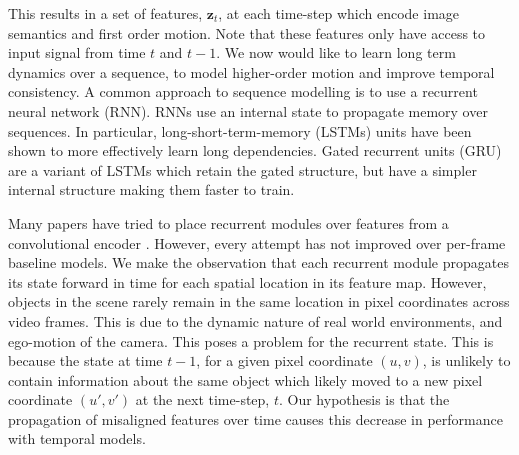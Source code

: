 This results in a set of features, $\mathbf{z}_t$, at each time-step which encode image semantics and first order motion. Note that these features only have access to input signal from time $t$ and $t-1$. We now would like to learn long term dynamics over a sequence, to model higher-order motion and improve temporal consistency. A common approach to sequence modelling is to use a recurrent neural network (RNN). RNNs use an internal state to propagate memory over sequences. In particular, long-short-term-memory (LSTMs) units \cite{hochreiter1997long} have been shown to more effectively learn long dependencies. Gated recurrent units (GRU) \cite{cho2014learning} are a variant of LSTMs which retain the gated structure, but have a simpler internal structure making them faster to train.

Many papers have tried to place recurrent modules over features from a convolutional encoder \cite{patraucean2015spatio,valipour2017recurrent}. However, every attempt has not improved over per-frame baseline models. We make the observation that each recurrent module propagates its state forward in time for each spatial location in its feature map. However, objects in the scene rarely remain in the same location in pixel coordinates across video frames. This is due to the dynamic nature of real world environments, and ego-motion of the camera. This poses a problem for the recurrent state. This is because the state at time $t-1$, for a given pixel coordinate $(u,v)$, is unlikely to contain information about the same object which likely moved to a new pixel coordinate $(u',v')$ at the next time-step, $t$. Our hypothesis is that the propagation of misaligned features over time causes this decrease in performance with temporal models.

